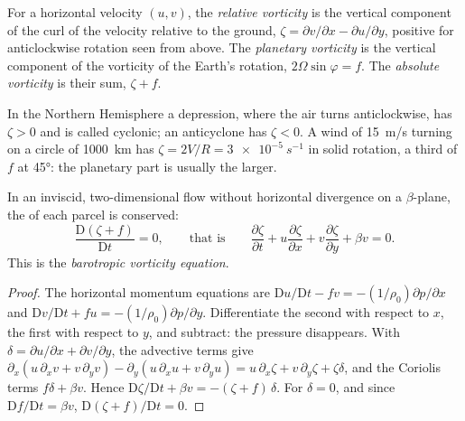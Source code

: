 \begin{definition}\label{def:b3:atmospheric-dynamics:vorticity-kinds}
For a horizontal velocity $(u, v)$, the \emph{relative
vorticity} is the vertical component of the curl
of the velocity relative to the ground, $\zeta = \partial v/\partial x -
\partial u/\partial y$, positive for anticlockwise rotation seen from above.
The \emph{planetary vorticity} is the vertical
component of the vorticity of the Earth's rotation, $2\Omega\sin\varphi =
f$. The \emph{absolute vorticity} is their sum,
$\zeta + f$.
\end{definition}

In the Northern Hemisphere a depression, where the air turns anticlockwise,
has $\zeta > 0$ and is called cyclonic; an anticyclone has $\zeta < 0$. A
wind of \qty{15}{m/s} turning on a circle of \qty{1000}{km} has $\zeta =
2V/R = \qty{3e-5}{s^{-1}}$ in solid rotation, a third of $f$ at \ang{45}:
the planetary part is usually the larger.

\begin{theorem}\label{thm:b3:atmospheric-dynamics:bve}
In an inviscid, two-dimensional flow without horizontal divergence on a
$\beta$-plane, the  of each parcel is conserved:
\[
\frac{\mathrm D(\zeta + f)}{\mathrm Dt} = 0 ,
\qquad\text{that is}\qquad
\frac{\partial\zeta}{\partial t} + u\frac{\partial\zeta}{\partial x} + v\frac{\partial\zeta}{\partial y} + \beta v = 0 .
\]
This is the \emph{barotropic vorticity equation}.
\end{theorem}

\begin{proof}
The horizontal momentum equations are $\mathrm Du/\mathrm Dt - fv =
-(1/\rho_0)\partial p/\partial x$ and $\mathrm Dv/\mathrm Dt + fu =
-(1/\rho_0)\partial p/\partial y$. Differentiate the second with respect to
$x$, the first with respect to $y$, and subtract: the pressure disappears.
With $\delta = \partial u/\partial x + \partial v/\partial y$, the
advective terms give $\partial_x(u\,\partial_xv + v\,\partial_yv) -
\partial_y(u\,\partial_xu + v\,\partial_yu) = u\,\partial_x\zeta +
v\,\partial_y\zeta + \zeta\delta$, and the Coriolis terms $f\delta + \beta
v$. Hence $\mathrm D\zeta/\mathrm Dt + \beta v = -(\zeta + f)\,\delta$. For
$\delta = 0$, and since $\mathrm Df/\mathrm Dt = \beta v$, $\mathrm D(\zeta +
f)/\mathrm Dt = 0$.
\end{proof}

